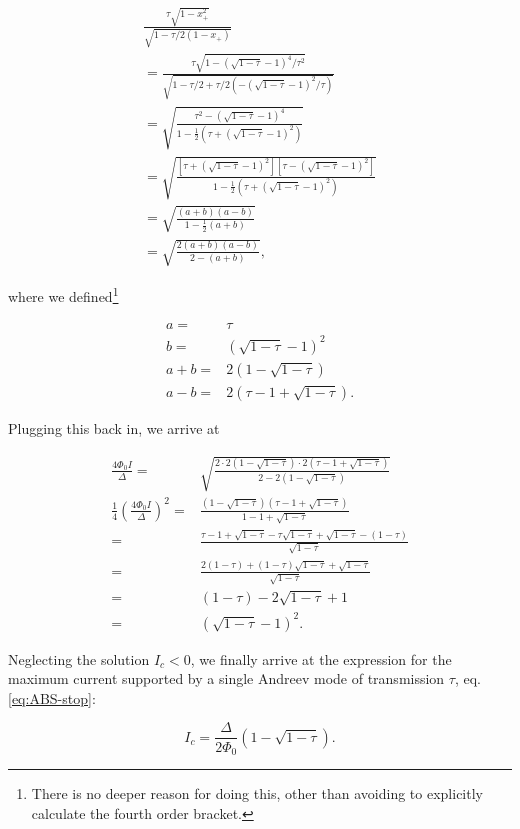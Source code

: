 \begin{eqnarray}
\frac{\tau\sqrt{1-x_{+}^2}}{\sqrt{1-\tau/2(1-x_{+})}} \\
= \frac{ \tau\sqrt{1-(\sqrt{1-\tau}-1)^4/\tau^2} }{ \sqrt{1-\tau/2+\tau/2(-(\sqrt{1-\tau}-1)^2/\tau)} } \\
	= \sqrt{ \frac{ \tau^2-(\sqrt{1-\tau}-1)^4 }{ 1-\frac{1}{2} \left( \tau+(\sqrt{1-\tau}-1)^2 \right) } } \\
	= \sqrt{ \frac{ \left\lbrack \tau+(\sqrt{1-\tau}-1)^2 \right\rbrack \left\lbrack \tau-(\sqrt{1-\tau}-1)^2 \right\rbrack }{ 1-\frac{1}{2} \left( \tau+(\sqrt{1-\tau}-1)^2 \right) } } \\
	= \sqrt{\frac{(a+b)(a-b)}{1-\frac{1}{2}(a+b)}} \\ 
	= \sqrt{\frac{2(a+b)(a-b)}{2-(a+b)}},
\end{eqnarray}

where we defined\footnote{There is no deeper reason for doing this, other than avoiding to explicitly calculate the fourth order bracket.}

\begin{eqnarray}
a =& \tau \\
b =& (\sqrt{1-\tau}-1)^2 \\
a+b =& 2(1-\sqrt{1-\tau}) \\
a-b =& 2(\tau-1+\sqrt{1-\tau}).
\end{eqnarray}

Plugging this back in, we arrive at

\begin{eqnarray}
\frac{4\Phi_0I}{\Delta} =& \sqrt{ \frac{ 2\cdot2(1-\sqrt{1-\tau}) \cdot 2(\tau-1+\sqrt{1-\tau}) }{ 2-2(1-\sqrt{1-\tau}) } } \\
\frac{1}{4}\left( \frac{4\Phi_0I}{\Delta} \right)^2 =& \frac{ (1-\sqrt{1-\tau})(\tau-1+\sqrt{1-\tau}) }{ 1-1+\sqrt{1-\tau} } \\
=& \frac{\tau-1+\sqrt{1-\tau}-\tau\sqrt{1-\tau}+\sqrt{1-\tau}-(1-\tau)}{\sqrt{1-\tau}} \\
=& \frac{2(1-\tau)+(1-\tau)\sqrt{1-\tau}+\sqrt{1-\tau}}{\sqrt{1-\tau}} \\
=& (1-\tau)-2\sqrt{1-\tau}+1 \\
=& (\sqrt{1-\tau}-1)^2.
\end{eqnarray}

Neglecting the solution $I_c<0$, we finally arrive at the expression for the maximum current supported by a single Andreev mode of transmission $\tau$, eq.\ref{eq:ABS-stop}:

\begin{equation}
I_c=\frac{\Delta}{2\Phi_0} \left( 1-\sqrt{1-\tau} \right).
\end{equation}

\clearpage
{}

